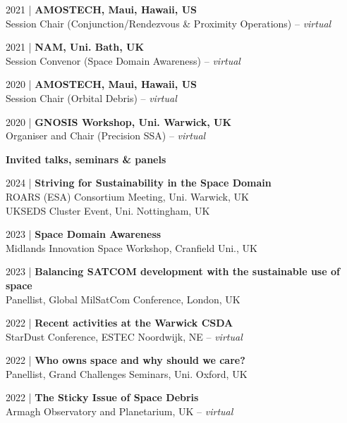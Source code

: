 \documentclass[10pt,a4paper]{altacv}
\begin{document}
\smallskip

\small 2021 | \textbf{AMOSTECH, Maui, Hawaii, US} \\
Session Chair (Conjunction/Rendezvous \& Proximity Operations) -- \textit{virtual}

\smallskip

\small 2021 | \textbf{NAM, Uni. Bath, UK} \\
Session Convenor (Space Domain Awareness) -- \textit{virtual}

\smallskip

\small 2020 | \textbf{AMOSTECH, Maui, Hawaii, US} \\
Session Chair (Orbital Debris) -- \textit{virtual}

\smallskip

\small 2020 | \textbf{GNOSIS Workshop, Uni. Warwick, UK} \\
Organiser and Chair (Precision SSA) -- \textit{virtual}

\divider

\normalsize \textbf{Invited talks, seminars \& panels}

\medskip

\small 2024 | \textbf{Striving for Sustainability in the Space Domain} \\
ROARS (ESA) Consortium Meeting, Uni. Warwick, UK \\
UKSEDS Cluster Event, Uni. Nottingham, UK

\smallskip

\small 2023 | \textbf{Space Domain Awareness} \\
Midlands Innovation Space Workshop, Cranfield Uni., UK

\smallskip

\small 2023 | \textbf{Balancing SATCOM development with the sustainable use of space} \\
Panellist, Global MilSatCom Conference, London, UK

\smallskip

\small 2022 | \textbf{Recent activities at the Warwick CSDA} \\
StarDust Conference, ESTEC Noordwijk, NE -- \textit{virtual}

\smallskip

\small 2022 | \textbf{Who owns space and why should we care?} \\
Panellist, Grand Challenges Seminars, Uni. Oxford, UK

\smallskip

\small 2022 | \textbf{The Sticky Issue of Space Debris} \\
Armagh Observatory and Planetarium, UK -- \textit{virtual}
\end{document}
